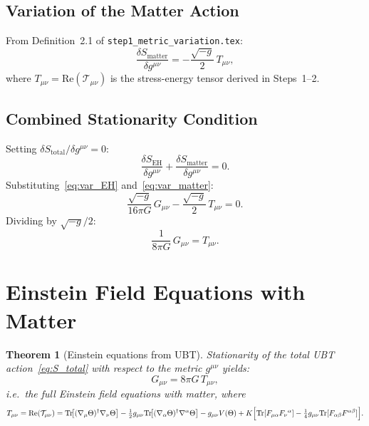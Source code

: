 \documentclass[12pt]{article}
\newtheorem{theorem}[definition]{Theorem}
\newcommand{\Tr}{\mathrm{Tr}}
\newcommand{\re}{\mathrm{Re}}
\begin{document}
\subsection{Variation of the Matter Action}

From Definition~2.1 of \texttt{step1\_metric\_variation.tex}:
\begin{equation}
  \label{eq:var_matter}
  \frac{\delta S_{\mathrm{matter}}}{\delta g^{\mu\nu}}
  = -\frac{\sqrt{-g}}{2}\,T_{\mu\nu},
\end{equation}
where $T_{\mu\nu} = \re(\mathcal{T}_{\mu\nu})$ is the stress-energy tensor
derived in Steps~1--2.

\subsection{Combined Stationarity Condition}

Setting $\delta S_{\mathrm{total}}/\delta g^{\mu\nu} = 0$:
\begin{equation}
  \frac{\delta S_{\mathrm{EH}}}{\delta g^{\mu\nu}}
  + \frac{\delta S_{\mathrm{matter}}}{\delta g^{\mu\nu}} = 0.
\end{equation}
Substituting~\eqref{eq:var_EH} and~\eqref{eq:var_matter}:
\begin{equation}
  \frac{\sqrt{-g}}{16\pi G}\,G_{\mu\nu}
  - \frac{\sqrt{-g}}{2}\,T_{\mu\nu} = 0.
\end{equation}
Dividing by $\sqrt{-g}/2$:
\begin{equation}
  \frac{1}{8\pi G}\,G_{\mu\nu} = T_{\mu\nu}.
\end{equation}

\section{Einstein Field Equations with Matter}

\begin{theorem}[Einstein equations from UBT]
\label{thm:einstein}
Stationarity of the total UBT action~\eqref{eq:S_total} with respect to
the metric $g^{\mu\nu}$ yields:
\begin{equation}
  \label{eq:einstein_matter}
  \boxed{G_{\mu\nu} = 8\pi G\,T_{\mu\nu},}
\end{equation}
i.e.\ the full Einstein field equations \emph{with matter}, where
\begin{equation}
  T_{\mu\nu}
  = \re(\mathcal{T}_{\mu\nu})
  = \Tr\!\bigl[(\nabla_\mu\Theta)^\dagger\nabla_\nu\Theta\bigr]
    -\tfrac{1}{2}g_{\mu\nu}\Tr\!\bigl[(\nabla_\alpha\Theta)^\dagger
    \nabla^\alpha\Theta\bigr]
    - g_{\mu\nu}V(\Theta)
    + K\Bigl[\Tr[F_{\mu\alpha}F_\nu{}^\alpha]
      -\tfrac{1}{4}g_{\mu\nu}\Tr[F_{\alpha\beta}F^{\alpha\beta}]\Bigr].
\end{equation}
\end{theorem}
\end{document}

